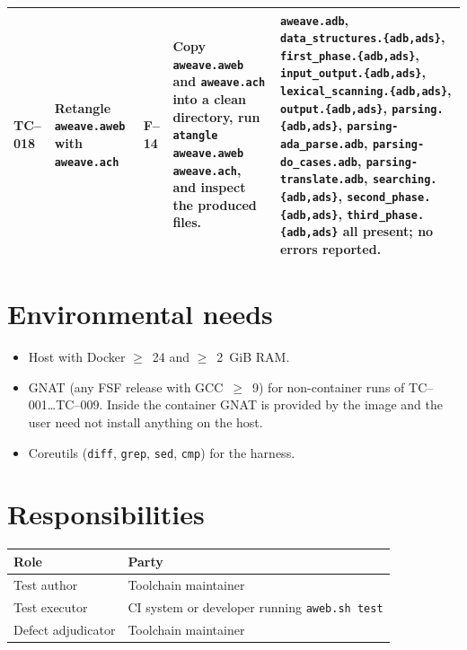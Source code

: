 \documentclass[11pt]{article}
\begin{document}
{\begin{longtable}{@{}lp{3.5cm}lp{4.6cm}p{4.0cm}@{}}
TC--018 & Retangle \texttt{aweave.aweb} with \texttt{aweave.ach} & F--14 &
Copy \texttt{aweave.aweb} and \texttt{aweave.ach} into a clean
directory, run \texttt{atangle aweave.aweb aweave.ach}, and inspect
the produced files. &
\texttt{aweave.adb}, \texttt{data\_structures.\{adb,ads\}},
\texttt{first\_phase.\{adb,ads\}},
\texttt{input\_output.\{adb,ads\}},
\texttt{lexical\_scanning.\{adb,ads\}},
\texttt{output.\{adb,ads\}},
\texttt{parsing.\{adb,ads\}},
\texttt{parsing-ada\_parse.adb}, \texttt{parsing-do\_cases.adb},
\texttt{parsing-translate.adb},
\texttt{searching.\{adb,ads\}},
\texttt{second\_phase.\{adb,ads\}},
\texttt{third\_phase.\{adb,ads\}} all present; no errors reported.\\
\bottomrule
\end{longtable}
}

\section{Environmental needs}
\begin{itemize}[leftmargin=*]
  \item Host with Docker $\geq$~24 and $\geq$~2~GiB RAM.
  \item GNAT (any FSF release with GCC~$\geq$~9) for non-container runs
        of TC--001\dots TC--009.  Inside the container GNAT is provided
        by the image and the user need not install anything on the
        host.
  \item Coreutils (\texttt{diff}, \texttt{grep}, \texttt{sed},
        \texttt{cmp}) for the harness.
\end{itemize}

\section{Responsibilities}

\begin{center}
\begin{tabular}{@{}ll@{}}
\toprule
Role               & Party\\
\midrule
Test author        & Toolchain maintainer\\
Test executor      & CI system or developer running
                     \texttt{aweb.sh test}\\
Defect adjudicator & Toolchain maintainer\\
\bottomrule
\end{tabular}
\end{center}
\end{document}
